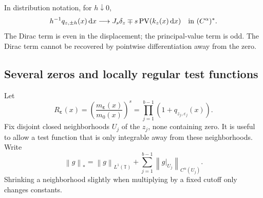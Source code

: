 \documentclass[11pt,a4paper]{article}
\numberwithin{equation}{section}
\theoremstyle{definition}
\theoremstyle{remark}
\newcommand{\TT}{\mathbb T}
\newcommand{\dd}{\,\mathrm d}
\newcommand{\PV}{\operatorname{PV}}
\newcommand{\norm}[1]{\left\lVert#1\right\rVert}
\newcommand{\eps}{\boldsymbol\varepsilon}
\begin{document}
In distribution notation, for $h\downarrow0$,
\begin{equation}
 h^{-1}q_{z,\pm h}(x)\dd x
 \longrightarrow J_s\delta_z\mp s\PV(k_z(x)\dd x)
 \quad\hbox{in }(C^\alpha)^*.
 \label{eq:distribution}
\end{equation}
The Dirac term is even in the displacement; the principal-value term
is odd. The Dirac term cannot be recovered by pointwise differentiation
away from the zero.

\subsection{Several zeros and locally regular test functions}
Let
\begin{equation}
 R_{\eps}(x)=\left(\frac{m_{\eps}(x)}{m_0(x)}\right)^s
          =\prod_{j=1}^{b-1}(1+q_{z_j,\varepsilon_j}(x)).
 \label{eq:ratio}
\end{equation}
Fix disjoint closed neighborhoods $U_j$ of the $z_j$, none containing
zero. It is useful to allow a test function that is only integrable
away from these neighborhoods. Write
\[
 \norm g_* =\norm g_{L^1(\TT)}+
       \sum_{j=1}^{b-1}\norm{g|_{U_j}}_{C^\alpha(U_j)}.
\]
Shrinking a neighborhood slightly when multiplying by a fixed cutoff
only changes constants.
\end{document}
